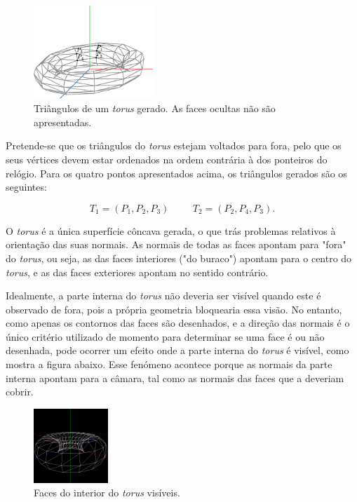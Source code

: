 \documentclass[12pt, a4paper]{article}
\begin{document}
\begin{figure}[H]
    \centering
    \includegraphics[width=0.4\textwidth]{res/figures/TorusTriangle.pdf}
    \caption{Triângulos de um \emph{torus} gerado. As faces ocultas não são apresentadas.}
\end{figure}

Pretende-se que os triângulos do \emph{torus} estejam voltados para fora, pelo que os seus vértices
devem estar ordenados na ordem contrária à dos ponteiros do relógio. Para os quatro pontos
apresentados acima, os triângulos gerados são os seguintes:

$$
T_1 = (P_1, P_2, P_3)
\hspace{1cm}
T_2 = (P_2, P_4, P_3).
$$

O \emph{torus} é a única superfície côncava gerada, o que trás problemas relativos à orientação das
suas normais. As normais de todas as faces apontam para "fora"{} do \emph{torus}, ou seja, as das
faces interiores ("do buraco"{}) apontam para o centro do \emph{torus}, e as das faces exteriores
apontam no sentido contrário.

Idealmente, a parte interna do \emph{torus} não deveria ser visível quando este é observado de fora,
pois a própria geometria bloquearia essa visão. No entanto, como apenas os contornos das faces são
desenhados, e a direção das normais é o único critério utilizado de momento para determinar se uma
face é ou não desenhada, pode ocorrer um efeito onde a parte interna do \emph{torus} é visível, como
mostra a figura abaixo. Esse fenómeno acontece porque as normais da parte interna apontam para a
câmara, tal como as normais das faces que a deveriam cobrir.

\begin{figure}[H]
    \centering
    \includegraphics[width=0.25\textwidth]{res/figures/TorusVisibleFaces.png}
    \caption{Faces do interior do \emph{torus} visíveis.}
\end{figure}
\end{document}
